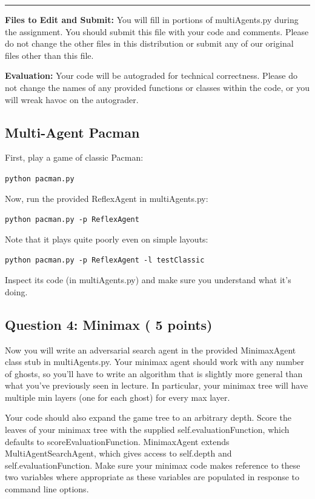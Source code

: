 \documentclass[a4paper, 11pt]{article}
\begin{document}
\rule{\textwidth}{0.5pt}

\textbf{Files to Edit and Submit:} You will fill in portions of \textsf{multiAgents.py} during the assignment. You should submit this file with your code and comments. Please do not change the other files in this distribution or submit any of our original files other than this file.

\textbf{Evaluation:} Your code will be autograded for technical correctness. Please do not change the names of any provided functions or classes within the code, or you will wreak havoc on the autograder.
\subsection{Multi-Agent Pacman}
First, play a game of classic Pacman:

\texttt{python pacman.py}

Now, run the provided \textsf{ReflexAgent} in \textsf{multiAgents.py}:

\texttt{python pacman.py -p ReflexAgent}

Note that it plays quite poorly even on simple layouts:

\texttt{python pacman.py -p ReflexAgent -l testClassic}

Inspect its code (in \textsf{multiAgents.py}) and make sure you understand what it's doing.
\subsection{Question 4: Minimax ( 5 points)}
Now you will write an adversarial search agent in the provided\textsf{ MinimaxAgent} class stub in \textsf{multiAgents.py}. Your minimax agent should work with any number of ghosts, so you'll have to write an algorithm that is slightly more general than what you've previously seen in lecture. In particular, your minimax tree will have multiple min layers (one for each ghost) for every max layer.

Your code should also expand the game tree to an arbitrary depth. Score the leaves of your minimax tree with the supplied \textsf{self.evaluationFunction}, which defaults to \textsf{scoreEvaluationFunction}. \textsf{MinimaxAgent} extends \textsf{MultiAgentSearchAgent}, which gives access to \textsf{self.depth} and \textsf{self.evaluationFunction}. Make sure your minimax code makes reference to these two variables where appropriate as these variables are populated in response to command line options.
\end{document}
